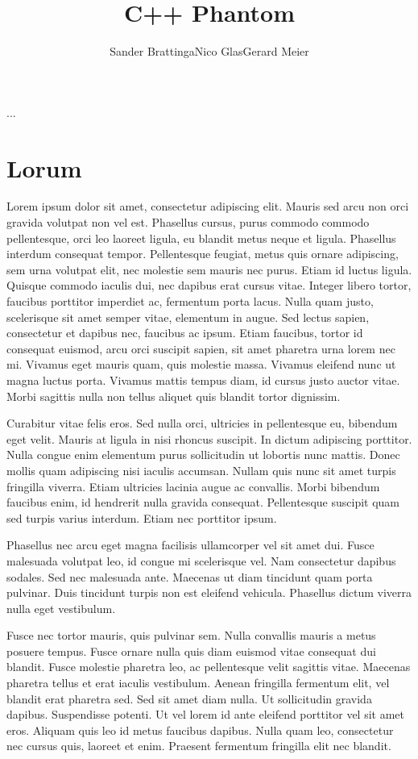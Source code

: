 \documentclass[acmtocl,acmnow]{acmtrans2m}
\title{C++ Phantom}
\author{Sander Brattinga\newline Nico Glas\newline Gerard Meier}
\begin{document}
\begin{bottomstuff} 
...
\end{bottomstuff}
            
\maketitle
\twocolumn
\section{Lorum}
Lorem ipsum dolor sit amet, consectetur adipiscing elit. Mauris sed arcu non orci gravida volutpat non vel est. Phasellus cursus, purus commodo commodo pellentesque, orci leo laoreet ligula, eu blandit metus neque et ligula. Phasellus interdum consequat tempor. Pellentesque feugiat, metus quis ornare adipiscing, sem urna volutpat elit, nec molestie sem mauris nec purus. Etiam id luctus ligula. Quisque commodo iaculis dui, nec dapibus erat cursus vitae. Integer libero tortor, faucibus porttitor imperdiet ac, fermentum porta lacus. Nulla quam justo, scelerisque sit amet semper vitae, elementum in augue. Sed lectus sapien, consectetur et dapibus nec, faucibus ac ipsum. Etiam faucibus, tortor id consequat euismod, arcu orci suscipit sapien, sit amet pharetra urna lorem nec mi. Vivamus eget mauris quam, quis molestie massa. Vivamus eleifend nunc ut magna luctus porta. Vivamus mattis tempus diam, id cursus justo auctor vitae. Morbi sagittis nulla non tellus aliquet quis blandit tortor dignissim.

Curabitur vitae felis eros. Sed nulla orci, ultricies in pellentesque eu, bibendum eget velit. Mauris at ligula in nisi rhoncus suscipit. In dictum adipiscing porttitor. Nulla congue enim elementum purus sollicitudin ut lobortis nunc mattis. Donec mollis quam adipiscing nisi iaculis accumsan. Nullam quis nunc sit amet turpis fringilla viverra. Etiam ultricies lacinia augue ac convallis. Morbi bibendum faucibus enim, id hendrerit nulla gravida consequat. Pellentesque suscipit quam sed turpis varius interdum. Etiam nec porttitor ipsum.

Phasellus nec arcu eget magna facilisis ullamcorper vel sit amet dui. Fusce malesuada volutpat leo, id congue mi scelerisque vel. Nam consectetur dapibus sodales. Sed nec malesuada ante. Maecenas ut diam tincidunt quam porta pulvinar. Duis tincidunt turpis non est eleifend vehicula. Phasellus dictum viverra nulla eget vestibulum.

Fusce nec tortor mauris, quis pulvinar sem. Nulla convallis mauris a metus posuere tempus. Fusce ornare nulla quis diam euismod vitae consequat dui blandit. Fusce molestie pharetra leo, ac pellentesque velit sagittis vitae. Maecenas pharetra tellus et erat iaculis vestibulum. Aenean fringilla fermentum elit, vel blandit erat pharetra sed. Sed sit amet diam nulla. Ut sollicitudin gravida dapibus. Suspendisse potenti. Ut vel lorem id ante eleifend porttitor vel sit amet eros. Aliquam quis leo id metus faucibus dapibus. Nulla quam leo, consectetur nec cursus quis, laoreet et enim. Praesent fermentum fringilla elit nec blandit.
\end{document}
